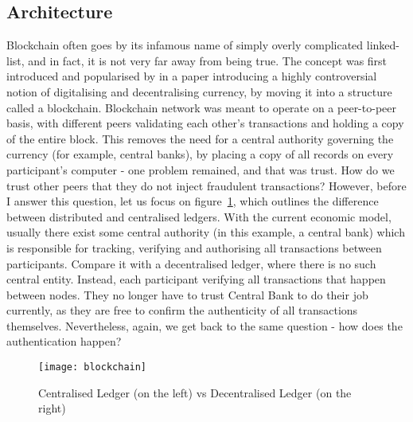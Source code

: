 \subsection{Architecture}
Blockchain often goes by its infamous name of simply overly complicated linked-list, and in fact, it is not very far away from being true. The concept was first introduced and popularised by \citet{nakamoto2008peer} in a paper introducing a highly controversial notion of digitalising and decentralising currency, by moving it into a structure called a blockchain. Blockchain network was meant to operate on a peer-to-peer basis, with different peers validating each other's transactions and holding a copy of the entire block. This removes the need for a central authority governing the currency (for example, central banks), by placing a copy of all records on every participant's computer - one problem remained, and that was trust. How do we trust other peers that they do not inject fraudulent transactions? However, before I answer this question, let us focus on figure~\ref{fig:blockchain}, which outlines the difference between distributed and centralised ledgers. With the current economic model, usually there exist some central authority (in this example, a central bank) which is responsible for tracking, verifying and authorising all transactions between participants. Compare it with a decentralised ledger, where there is no such central entity. Instead, each participant verifying all transactions that happen between nodes. They no longer have to trust Central Bank to do their job currently, as they are free to confirm the authenticity of all transactions themselves. Nevertheless, again, we get back to the same question - how does the authentication happen?

\begin{figure}[ht]
    \centering
    \texttt{[image: blockchain]}
    \caption{Centralised Ledger (on the left) vs Decentralised Ledger (on the right)}
    \label{fig:blockchain}
\end{figure}

